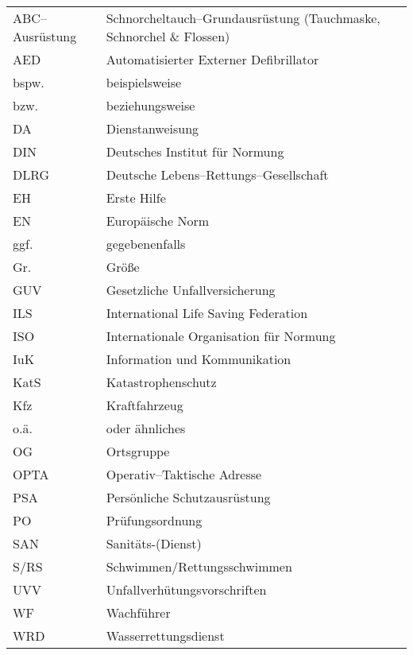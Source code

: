 \thispagestyle{scrheadings}
\begin{tabular}{ll}
ABC--Ausrüstung & Schnorcheltauch--Grundausrüstung (Tauchmaske, Schnorchel \& Flossen)\\
AED & Automatisierter Externer Defibrillator\\
bspw. & beispielsweise\\
bzw. & beziehungsweise\\
DA & Dienstanweisung\\
DIN & Deutsches Institut für Normung\\
DLRG & Deutsche Lebens--Rettungs--Gesellschaft\\
EH & Erste Hilfe\\
EN & Europäische Norm\\
ggf. & gegebenenfalls\\
Gr. & Größe\\
GUV & Gesetzliche Unfallversicherung\\
ILS & International Life Saving Federation\\
ISO & Internationale Organisation für Normung\\
IuK & Information und Kommunikation\\
KatS & Katastrophenschutz\\
Kfz & Kraftfahrzeug\\
o.ä. & oder ähnliches\\
OG & Ortsgruppe\\
OPTA & Operativ--Taktische Adresse\\
PSA & Persönliche Schutzausrüstung\\
PO & Prüfungsordnung\\
SAN & Sanitäts-(Dienst)\\
S/RS & Schwimmen/Rettungsschwimmen\\
UVV & Unfallverhütungsvorschriften\\
WF & Wachführer\\
WRD & Wasserrettungsdienst\\
\end{tabular}